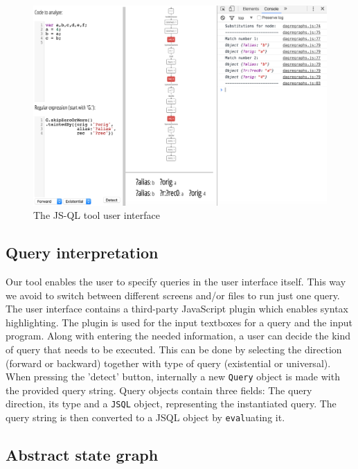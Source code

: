 \begin{figure}[h]
    \centering
      \includegraphics[width=1\textwidth]{images/UI} 
      \caption{The JS-QL tool user interface}
    \label{fig:UI}
\end{figure}

\subsection*{Query interpretation}

Our tool enables the user to specify queries in the user interface itself. This way we avoid to switch between different screens and/or files to run just one query. The user interface contains a third-party JavaScript plugin which enables syntax highlighting. The plugin is used for the input textboxes for a query and the input program. Along with entering the needed information, a user can decide the kind of query that needs to be executed. This can be done by selecting the direction (forward or backward) together with type of query (existential or universal). When pressing the 'detect' button, internally a new \texttt{Query} object is made with the provided query string. Query objects contain three fields: The query direction, its type and a \texttt{JSQL} object, representing the instantiated query. The query string is then converted to a JSQL object by \texttt{eval}uating it.

\subsection*{Abstract state graph}

